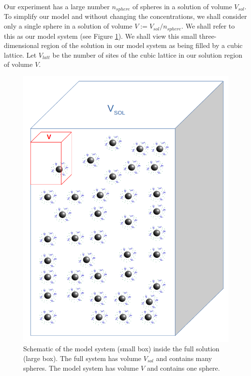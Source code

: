 \documentclass[journal=mamobx,manuscript=article]{achemso}
\begin{document}
Our experiment has a large number $n_{sphere}$ of spheres in a solution of volume $V_{sol}$.  
To simplify 
our model and without changing the concentrations, we shall consider only a single sphere in a solution
of volume $V:=V_{sol}/n_{sphere}$.  We shall refer to this as our model system (see Figure \ref{figure1volume}).
We shall view this small three-dimensional region of the solution in our model system as being filled by a 
cubic lattice.
Let $V_{latt}$ be the number of sites of the cubic 
lattice in our solution region of volume $V$.




 \begin{figure}[H] 
  \includegraphics[scale=0.5]{fig7a.png}
\caption{Schematic of the model system (small box)
inside the full solution (large box). The full system
has volume $V_{sol}$ and contains many spheres.  The model
system has volume $V$ and contains one sphere.}
\label{figure1volume}
\end{figure}
\end{document}
